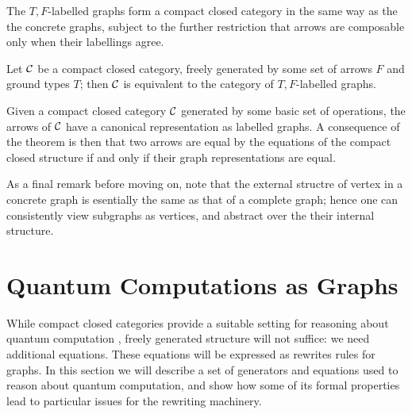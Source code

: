\documentclass[runningheads]{llncs}
\newcommand{\catC}{\ensuremath{{\cal C}}\xspace}
\begin{document}
The $T,F$-labelled graphs form a compact closed category in the same
way as the the concrete graphs, subject to the further restriction
that arrows are composable only when their labellings agree.  

\begin{theorem}
  Let \catC be a compact closed category, freely generated by some set
  of arrows $F$ and ground types $T$;  then \catC is equivalent to the
  category  of $T,F$-labelled graphs.
\end{theorem}

Given a compact closed  category  \catC generated by some basic set of
operations,  the arrows of \catC have a canonical representation as
labelled graphs.  A consequence of the theorem is then that two arrows
are equal by the equations of the compact closed  structure if and
only if their graph representations are equal.

As a final remark before moving on, note that the external structre of vertex
in a concrete graph is esentially the same as that of a complete
graph;  hence one can consistently view subgraphs as vertices, and
abstract over the their internal structure.

\section{Quantum Computations as Graphs}
\label{sec:quotients-rewriting}

While compact closed categories provide a suitable setting for
reasoning about quantum computation \cite{AbrCoe:CatSemQuant:2004},
freely generated structure will not suffice:  we need additional
equations.  These equations will be expressed as rewrites rules for
graphs.  In this section we will describe a set of generators and equations
used to reason about quantum computation, and show how some of its formal
properties lead to particular issues for the rewriting machinery.
\end{document}
